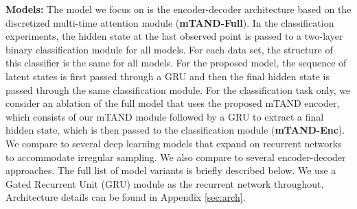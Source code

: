 \textbf{Models:} The model we focus on is the encoder-decoder architecture based on the discretized multi-time attention module (\textbf{mTAND-Full}). 
In the classification experiments, the hidden state at the last observed point is passed to a two-layer binary classification module for all models. For each data set, the structure of this classifier is the same for all models. For the proposed model, the sequence of latent states is first passed through a GRU and then the final hidden state is passed through the same classification module. For the classification task only, we consider an ablation of the full model that uses the proposed mTAND encoder, which consists of our mTAND module followed by a GRU to extract a final hidden state, which is then passed to the classification module (\textbf{mTAND-Enc}). 
We compare to several deep learning models that expand on recurrent networks to accommodate irregular sampling. We also compare to several encoder-decoder approaches. The full list of model variants is briefly described below. We use a Gated Recurrent Unit (GRU) \citep{gru} module as the recurrent network throughout. Architecture details can be found in Appendix \ref{sec:arch}. 
